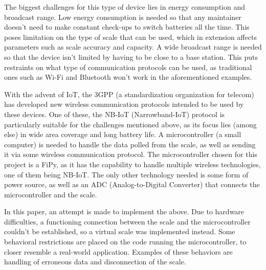 The biggest challenges for this type of device lies in energy consumption and broadcast range. Low energy consumption is needed so that any maintainer doesn't need to make constant check-ups to switch batteries all the time. This poses limitation on the type of scale that can be used, which in extension affects parameters such as scale accuracy and capacity. A wide broadcast range is needed so that the device isn't limited by having to be close to a base station. This puts restraints on what type of communication protocols can be used, as traditional ones such as Wi-Fi and Bluetooth won't work in the aforementioned examples.

With the advent of IoT, the 3GPP (a standardization organization for telecom) has developed new wireless communication protocols intended to be used by these devices. One of these, the NB-IoT (Narrowband-IoT) protocol is particularly suitable for the challenges mentioned above, as its focus lies (among else) in wide area coverage and long battery life. A microcontroller (a small computer) is needed to handle the data polled from the scale, as well as sending it via some wireless communication protocol. The microcontroller chosen for this project is a FiPy, as it has the capability to handle multiple wireless technologies, one of them being NB-IoT. The only other technology needed is some form of power source, as well as an ADC (Analog-to-Digital Converter) that connects the microcontroller and the scale.

In this paper, an attempt is made to implement the above. Due to hardware difficulties, a functioning connection between the scale and the microcontroller couldn't be established, so a virtual scale was implemented instead. Some behavioral restrictions are placed on the code running the microcontroller, to closer resemble a real-world application. Examples of these behaviors are handling of erroneous data and disconnection of the scale.








